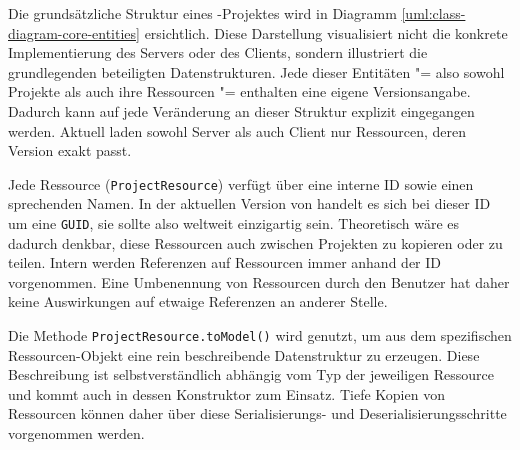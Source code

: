 Die grundsätzliche Struktur eines \idename-Projektes wird in Diagramm \ref{uml:class-diagram-core-entities} ersichtlich. Diese Darstellung visualisiert nicht die konkrete Implementierung des Servers oder des Clients, sondern illustriert die grundlegenden beteiligten Datenstrukturen. Jede dieser Entitäten "= also sowohl Projekte als auch ihre Ressourcen "= enthalten eine eigene Versionsangabe. Dadurch kann auf jede Veränderung an dieser Struktur explizit eingegangen werden. Aktuell laden sowohl Server als auch Client nur Ressourcen, deren Version exakt passt.

Jede Ressource (\texttt{ProjectResource}) verfügt über eine interne ID sowie einen sprechenden Namen. In der aktuellen Version von \idename{} handelt es sich bei dieser ID um eine \texttt{GUID}, sie sollte also weltweit einzigartig sein. Theoretisch wäre es dadurch denkbar, diese Ressourcen auch zwischen Projekten zu kopieren oder zu teilen. Intern werden Referenzen auf Ressourcen immer anhand der ID vorgenommen. Eine Umbenennung von Ressourcen durch den Benutzer hat daher keine Auswirkungen auf etwaige Referenzen an anderer Stelle.

Die Methode \texttt{ProjectResource.toModel()} wird genutzt, um aus dem spezifischen Res\-sour\-cen-Objekt eine rein beschreibende Datenstruktur zu erzeugen. Diese Beschreibung ist selbstverständlich abhängig vom Typ der jeweiligen Ressource und kommt auch in dessen Konstruktor zum Einsatz. Tiefe Kopien von Ressourcen können daher über diese Se\-ria\-lisierungs- und Deserialisierungsschritte vorgenommen werden.

